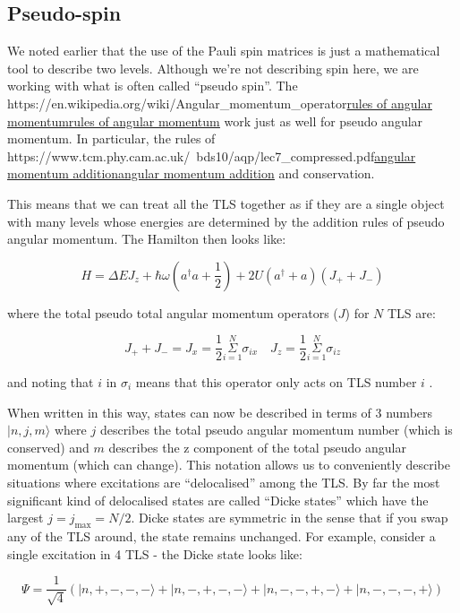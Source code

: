 \documentclass[
]{article}
\let\oldhref\href
\renewcommand{\href}[2]{\ifx#1\urlprefix\oldhref{#1}{#2}\else\uline{\oldhref{#1}{#2}}\fi}
\renewcommand{\[}{\begin{equation}}
\renewcommand{\]}{\end{equation}}
\begin{document}
\subsection{Pseudo-spin}\label{pseudo-spin}

We noted earlier that the use of the Pauli spin matrices is just a
mathematical tool to describe two levels. Although we're not describing
spin here, we are working with what is often called ``pseudo spin''. The
\href{https://en.wikipedia.org/wiki/Angular_momentum_operator}{rules of
angular momentum} work just as well for pseudo angular momentum. In
particular, the rules of
\href{https://www.tcm.phy.cam.ac.uk/~bds10/aqp/lec7_compressed.pdf}{angular
momentum addition} and conservation.

This means that we can treat all the TLS together as if they are a
single object with many levels whose energies are determined by the
addition rules of pseudo angular momentum. The Hamilton then looks like:

\[
H =  \Delta E J_{z} + \hbar\omega\left(a^{\dagger}a +\frac{1}{2}\right) + 2U\left( a^{\dagger} + a \right)(J_{+} + J_{-})
\label{eq:dickeHpseudo}
\]

where the total pseudo total angular momentum operators (\(J\)) for
\(N\) TLS are:

\[
J_{+} + J_{-} = J_{x} = \frac{1}{2}\overset{N}{\underset{i=1}{\Sigma}} \sigma_{i x} \,\,\,\,\,\, J_{z} = \frac{1}{2}\overset{N}{\underset{i=1}{\Sigma}} \sigma_{i z}
\]

and noting that \(i\) in \(\sigma_i\) means that this operator only acts
on TLS number \(i\) .

When written in this way, states can now be described in terms of 3
numbers \(|n, j, m\rangle\) where \(j\) describes the total pseudo
angular momentum number (which is conserved) and \(m\) describes the z
component of the total pseudo angular momentum (which can change). This
notation allows us to conveniently describe situations where excitations
are ``delocalised'' among the TLS. By far the most significant kind of
delocalised states are called ``Dicke states'' which have the largest
\(j=j_{\max} = N/2\). Dicke states are symmetric in the sense that if
you swap any of the TLS around, the state remains unchanged. For
example, consider a single excitation in 4 TLS - the Dicke state looks
like:

\[
\Psi = \frac{1}{\sqrt{4}}\left(| n, +, -, -, - \rangle + | n, -, +, -, - \rangle + | n, -, -, +, - \rangle + | n, -, -, -, + \rangle \right)
\]
\end{document}
